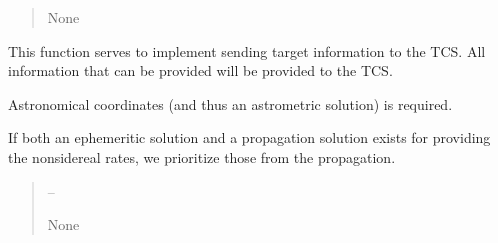 \documentclass[letterpaper,11pt,english]{sphinxmanual}
\begin{document}
\begin{savenotes}
\begin{fulllineitems}
\begin{savenotes}
\begin{fulllineitems}
\begin{quote}
\begin{description}
\sphinxAtStartPar
None

\end{description}\end{quote}

\end{fulllineitems}\end{savenotes}


\begin{savenotes}\begin{fulllineitems}
\label{\detokenize{code/opihiexarata.gui.manual:opihiexarata.gui.manual.OpihiManualWindow.__connect_push_button_summary_send_target_to_tcs}}
\pysigstartsignatures
{}
\pysigstopsignatures
\sphinxAtStartPar
This function serves to implement sending target information to the
TCS. All information that can be provided will be provided to the TCS.

\sphinxAtStartPar
Astronomical coordinates (and thus an astrometric solution) is
required.

\sphinxAtStartPar
If both an ephemeritic solution and a propagation solution exists
for providing the non\sphinxhyphen{}sidereal rates, we prioritize those from
the propagation.
\begin{quote}\begin{description}
\sphinxAtStartPar
{} – 

\sphinxAtStartPar
None

\end{description}\end{quote}

\end{fulllineitems}\end{savenotes}



\end{fulllineitems}
\end{savenotes}
\end{document}
